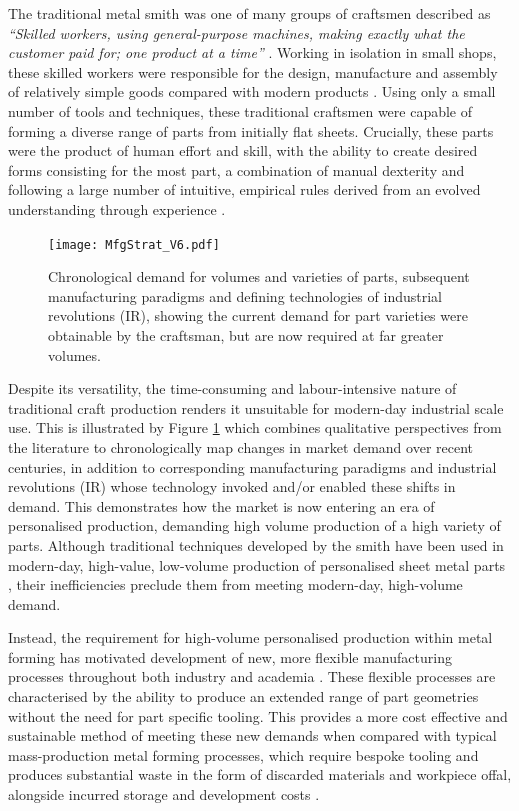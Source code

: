 The traditional metal smith was one of many groups of craftsmen described as \textit{``Skilled workers, using general-purpose machines, making exactly what the customer paid for; one product at a time''} \citep{Koren2010TheRevolution}. Working in isolation in small shops, these skilled workers were responsible for the design, manufacture and assembly of relatively simple goods compared with modern products \citep{Groover2015AutomationEdition}.  Using only a small number of tools and techniques, these traditional craftsmen were capable of forming a diverse range of parts from initially flat sheets. Crucially, these parts were the product of human effort and skill, with the ability to create desired forms consisting for the most part, a combination of manual dexterity and following a large number of intuitive, empirical rules derived from an evolved understanding through experience \citep{Hall1961EngineeringRevolution}. 

\begin{figure}[h]
	\centering
	\texttt{[image: MfgStrat\_V6.pdf]}
	\caption{Chronological demand for volumes and varieties of parts, subsequent manufacturing paradigms and defining technologies of industrial revolutions (IR), showing the current demand for part varieties were obtainable by the craftsman, but are now required at far greater volumes.}
	\label{fig:VarietyVolume}
\end{figure}

Despite its versatility, the time-consuming and labour-intensive nature of traditional craft production renders it unsuitable for modern-day industrial scale use. This is illustrated by Figure \ref{fig:VarietyVolume} which combines qualitative perspectives from the literature \citep{Koren2010TheRevolution,Popkova2019FundamentalRevolutions,Mourtzis2012DecentralizedOutlook,Mourtzis2014TheCustomisation} to chronologically map changes in market demand over recent centuries, in addition to corresponding manufacturing paradigms and industrial revolutions (IR) whose technology invoked  and/or enabled these shifts in demand. This demonstrates how the market is now entering an era of personalised production, demanding high volume production of a high variety of parts. Although traditional techniques developed by the smith have been used in modern-day, high-value, low-volume production of personalised sheet metal parts \citep{Amos2015Bloodhoundfeathers}, their inefficiencies preclude them from meeting modern-day, high-volume demand.

Instead, the requirement for high-volume personalised production within metal forming has motivated development of new, more flexible manufacturing processes throughout both industry and academia \citep{Allwood2006AJapan,Yang2018FlexibilityForming}. These flexible processes are characterised by the ability to produce an extended range of part geometries without the need for part specific tooling. This provides a more cost effective and sustainable method of meeting these new demands when compared with typical mass-production metal forming processes, which require bespoke tooling and produces substantial waste in the form of discarded materials and workpiece offal, alongside incurred storage and development costs \citep{Cooper2017TheProcesses,Horton2019ImplementingComponents}. 


